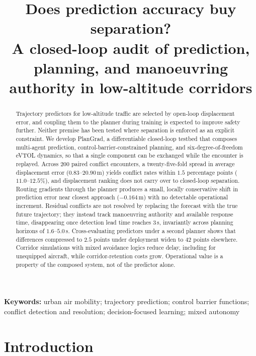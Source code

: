 \documentclass[11pt]{article}
\theoremstyle{plain}
\theoremstyle{definition}
\newcommand{\method}{PlanGrad}
\begin{document}
\title{\bf Does prediction accuracy buy separation?\\
	A closed-loop audit of prediction, planning, and manoeuvring
	authority in low-altitude corridors}

\author{}
\date{}

\maketitle

\begin{abstract}
	Trajectory predictors for low-altitude traffic are selected by
	open-loop displacement error, and coupling them to the planner
	during training is expected to improve safety further. Neither
	premise has been tested where separation is enforced as an explicit
	constraint. We develop \method, a differentiable closed-loop testbed
	that composes multi-agent prediction, control-barrier-constrained
	planning, and six-degree-of-freedom eVTOL dynamics, so that a single
	component can be exchanged while the encounter is replayed. Across
	$200$ paired conflict encounters, a twenty-five-fold spread in
	average displacement error ($0.83$--$20.90$\,m) yields conflict
	rates within $1.5$ percentage points ($11.0$--$12.5\%$), and
	displacement ranking does not carry over to closed-loop separation.
	Routing gradients through the planner produces a small, locally
	conservative shift in prediction error near closest approach
	($-0.164$\,m) with no detectable operational increment. Residual
	conflicts are not resolved by replacing the forecast with the true
	future trajectory; they instead track manoeuvring authority and
	available response time, disappearing once detection lead time
	reaches $3$\,s, invariantly across planning horizons of
	$1.6$--$5.0$\,s. Cross-evaluating predictors under a second planner
	shows that differences compressed to $2.5$ points under deployment
	widen to $42$ points elsewhere. Corridor simulations with mixed
	avoidance logics reduce delay, including for unequipped aircraft,
	while corridor-retention costs grow. Operational value is a property
	of the composed system, not of the predictor alone.
\end{abstract}

\noindent\textbf{Keywords:} urban air mobility; trajectory prediction;
control barrier functions; conflict detection and resolution;
decision-focused learning; mixed autonomy

\section{Introduction}
\end{document}
